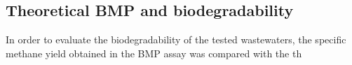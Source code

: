 \subsection{Theoretical BMP and biodegradability}
In order to evaluate the biodegradability of the tested wastewaters, the specific methane yield obtained in the BMP assay was compared with the th
